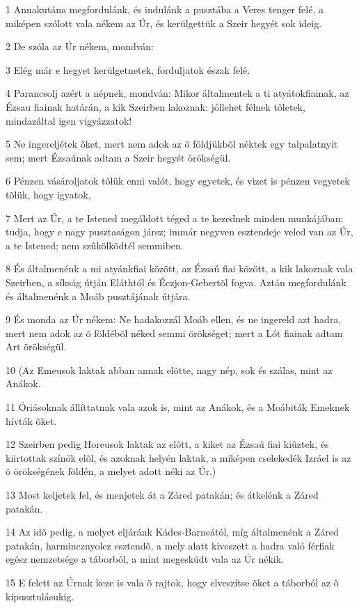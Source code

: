 \par 1 Annakutána megfordulánk, és indulánk a pusztába a Veres tenger felé, a miképen szólott vala nékem az Úr, és kerülgettük a Szeir hegyét sok ideig.
\par 2 De szóla az Úr nékem, mondván:
\par 3 Elég már e hegyet kerülgetnetek, forduljatok észak felé.
\par 4 Parancsolj azért a népnek, mondván: Mikor általmentek a ti atyátokfiainak, az Ézsau fiainak határán, a kik Szeirben lakoznak: jóllehet félnek tõletek, mindazáltal igen vigyázzatok!
\par 5 Ne ingereljétek õket, mert nem adok az õ földjükbõl néktek egy talpalatnyit sem; mert Ézsaúnak adtam a Szeir hegyét örökségül.
\par 6 Pénzen vásároljatok tõlük enni valót, hogy egyetek, és vizet is pénzen vegyetek tõlük, hogy igyatok,
\par 7 Mert az Úr, a te Istened megáldott téged a te kezednek minden munkájában; tudja, hogy e nagy pusztaságon jársz; immár negyven esztendeje veled van az Úr, a te Istened; nem szûkölködtél semmiben.
\par 8 És általmenénk a mi atyánkfiai között, az Ézsaú fiai között, a kik lakoznak vala Szeirben, a síkság útján Eláthtól és Éczjon-Gebertõl fogva. Aztán megfordulánk és általmenénk a Moáb pusztájának útjára.
\par 9 És monda az Úr nékem: Ne hadakozzál Moáb ellen, és ne ingereld azt hadra, mert nem adok az õ földébõl néked semmi örökséget; mert a Lót fiainak adtam Art örökségül.
\par 10 (Az Emeusok laktak abban annak elõtte, nagy nép, sok és szálas, mint az Anákok.
\par 11 Óriásoknak állíttatnak vala azok is, mint az Anákok, és a Moábiták Emeknek hívták õket.
\par 12 Szeirben pedig Horeusok laktak az elõtt, a kiket az Ézsaú fiai kiûztek, és kiirtottak színök elõl, és azoknak helyén laktak, a miképen cselekedék Izráel is az õ örökségének földén, a melyet adott néki az Úr.)
\par 13 Most keljetek fel, és menjetek át a Záred patakán; és átkelénk a Záred patakán.
\par 14 Az idõ pedig, a melyet eljáránk Kádes-Barneától, míg általmenénk a Záred patakán, harmincznyolcz esztendõ, a mely alatt kiveszett a hadra való férfiak egész nemzetsége a táborból, a mint megesküdt vala az Úr nékik.
\par 15 E felett az Úrnak keze is vala õ rajtok, hogy elveszítse õket a táborból az õ kipusztulásukig.
